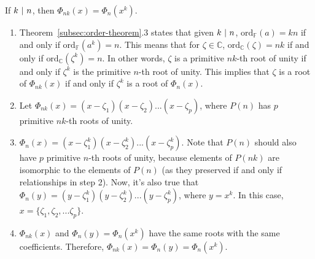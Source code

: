 \begin{tcolorbox}[title={\textbf{\tboxtheorem{\ref*{subsec:cyclotomic-theorem}.4} Formula for $\bm{\Phi_{nk}(x)}$}}]
If $k \text{ } \text{$|$} \text{ } n$, then $\Phi_{nk}(x) = \Phi_n(x^k)$.
\end{tcolorbox}
\begin{myproof}
\begin{enumerate}
    \item Theorem~\ref*{subsec:order-theorem}.3 states that given $k \text{ } \text{$|$} \text{ } n$, $\text{ord}_\mathbb{F}(a) = kn$ if and only if $\text{ord}_\mathbb{F}(a^k) = n$. This means that for $\zeta \in \mathbb{C}$, $\text{ord}_\mathbb{C}(\zeta) = nk$ if and only if $\text{ord}_\mathbb{C}(\zeta^k) = n$. In other words, $\zeta$ is a primitive $nk$-th root of unity if and only if $\zeta^k$ is the primitive $n$-th root of unity. This implies that $\zeta$ is a root of $\Phi_{nk}(x)$ if and only if $\zeta^k$ is a root of $\Phi_{n}(x)$. 
    \item Let $\Phi_{nk}(x) = (x - \zeta_1)(x - \zeta_2)...(x - \zeta_p)$, where $P(n)$ has $p$ primitive $nk$-th roots of unity.
    \item $\Phi_{n}(x) = (x - \zeta_1^k)(x - \zeta_2^k)...(x - \zeta_p^k)$. Note that $P(n)$ should also have $p$ primitive $n$-th roots of unity, because elements of $P(nk)$ are isomorphic to the elements of $P(n)$ (as they preserved if and only if relationships in step 2). Now, it's also true that $\Phi_{n}(y) = (y - \zeta_1^k)(y - \zeta_2^k)...(y - \zeta_p^k)$, where $y = x^k$. In this case, $x = \{\zeta_1, \zeta_2, ... \zeta_p\}$.
    \item $\Phi_{nk}(x)$ and $\Phi_{n}(y) = \Phi_{n}(x^k)$ have the same roots with the same coefficients. Therefore, $\Phi_{nk}(x) = \Phi_{n}(y) = \Phi_{n}(x^k)$. 
\end{enumerate}
\end{myproof}
